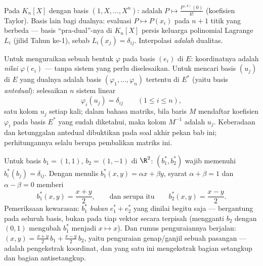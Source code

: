 \begin{example}\label{ex:b2:linalg:dualexamples}
Pada $K_n[X]$ dengan basis $(1, X, \dots, X^n)$:  adalah $P
\mapsto \frac{P^{(k)}(0)}{k!}$ (koefisien Taylor). Basis lain
bagi dualnya: evaluasi $P \mapsto P(x_i)$ pada $n + 1$ titik
yang berbeda --- basis ``pra-dual''-nya di $K_n[X]$ persis keluarga
polinomial Lagrange $L_i$ (jilid Tahun ke-1), sebab $L_i(x_j) =
\delta_{ij}$. Interpolasi \emph{adalah} dualitas.
\end{example}

\begin{method}\label{met:b2:linalg:dualbasis}
Untuk menguraikan sebuah bentuk $\varphi$ pada basis $(e_i)$ di $E$:
koordinatnya adalah \emph{nilai} $\varphi(e_i)$ --- tanpa sistem yang
perlu diselesaikan. Untuk mencari basis $(u_j)$ di $E$ yang dualnya
adalah basis $(\varphi_1, \dots, \varphi_n)$ tertentu di $E^*$ (yaitu
basis \emph{antedual}): selesaikan $n$ sistem linear
\[
\varphi_i(u_j) = \delta_{ij} \qquad (1 \leq i \leq n),
\]
satu kolom $u_j$ setiap kali; dalam bahasa matriks, bila baris $M$
mendaftar koefisien $\varphi_i$ pada basis $E^*$ yang sudah diketahui,
maka kolom $M^{-1}$ adalah $u_j$. Keberadaan dan
ketunggalan antedual dibuktikan pada soal akhir pekan bab ini;
perhitungannya selalu berupa pembalikan matriks ini.
\end{method}

\begin{example}\label{ex:b2:linalg:dualbasis2d}
Untuk basis $b_1 = (1, 1)$, $b_2 = (1, -1)$ di $\R^2$:
 $(b_1^*, b_2^*)$ wajib memenuhi $b_i^*(b_j) =
\delta_{ij}$. Dengan menulis $b_1^*(x, y) = \alpha x + \beta y$, syarat
$\alpha + \beta = 1$ dan $\alpha - \beta = 0$ memberi
\[
b_1^*(x, y) = \frac{x + y}{2},
\qquad\text{dan serupa itu}\qquad
b_2^*(x, y) = \frac{x - y}{2} .
\]
Pemeriksaan kewarasan: $b_1^*$ \emph{bukan} $e_1^* + e_2^*$ yang dinilai
begitu saja ---  bergantung pada seluruh basis, bukan pada
tiap vektor secara terpisah (mengganti $b_2$ dengan $(0, 1)$ mengubah
$b_1^*$ menjadi $x \mapsto x$). Dan rumus penguraiannya berjalan:
$(x, y) = \frac{x+y}2\,b_1 + \frac{x-y}2\,b_2$, yaitu penguraian
genap/ganjil sebuah pasangan ---  adalah pengekstrak
koordinat, dan yang satu ini mengekstrak bagian setangkup dan bagian
antisetangkup.
\end{example}

